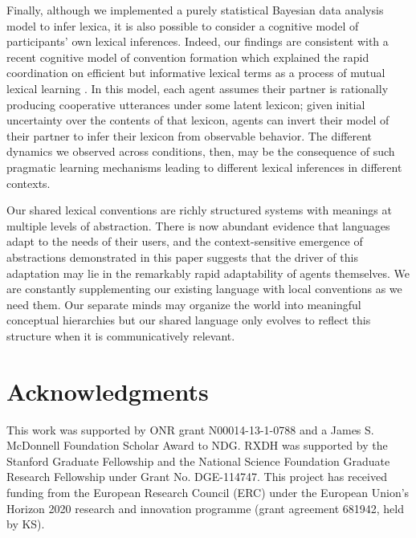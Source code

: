 \documentclass[10pt,letterpaper]{article}
\begin{document}
Finally, although we implemented a purely statistical Bayesian data analysis model to infer lexica, it is also possible to consider a cognitive model of participants' own lexical inferences. Indeed, our findings are consistent with a recent cognitive model of convention formation which explained the rapid coordination on efficient but informative lexical terms as a process of mutual lexical learning \cite{HawkinsFrankGoodman17_ConventionFormation}. %
In this model, each agent assumes their partner is rationally producing cooperative utterances under some latent lexicon; given initial uncertainty over the contents of that lexicon, agents can invert their model of their partner to infer their lexicon from observable behavior. 
The different dynamics we observed across conditions, then, may be the consequence of such pragmatic learning mechanisms leading to different lexical inferences in different contexts.%

Our shared lexical conventions are richly structured systems with meanings at multiple levels of abstraction. There is now abundant evidence that languages adapt to the needs of their users, and the context-sensitive emergence of abstractions demonstrated in this paper suggests that the driver of this adaptation may lie in the remarkably rapid adaptability of agents themselves. We are constantly supplementing our existing language with local conventions as we need them. Our separate minds may organize the world into meaningful conceptual hierarchies but our shared language only evolves to reflect this structure when it is communicatively relevant. 

\section{\bf Acknowledgments}
\small
This work was supported by ONR grant N00014-13-1-0788 and a James S. McDonnell Foundation Scholar Award to NDG. RXDH was supported by the Stanford Graduate Fellowship and the National Science Foundation Graduate Research Fellowship under Grant No. DGE-114747. This project has received funding from the European Research Council (ERC) under the European Union's Horizon 2020 research and innovation programme (grant agreement 681942, held by KS).
\vspace{-.20cm}


\setlength{\bibleftmargin}{.125in}
\setlength{\bibindent}{-\bibleftmargin}


\end{document}
